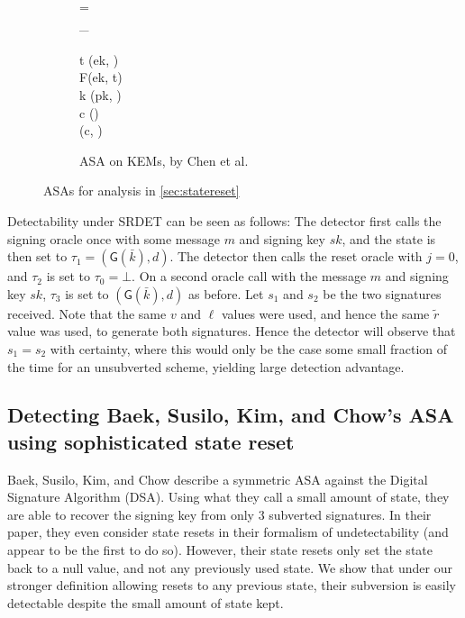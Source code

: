 \begin{figure}
\begin{subfigure}[t]{0.25\textwidth}
{	\pcif \tau = \bot \pcthen \\
	\pcind \tau \sample {}_ \\
	\pcelse \\
	\pcind t \leftarrow {}(ek, \tau) \\
	\pcind \tau \leftarrow \textsf{F}(ek, t) \\
	k \leftarrow {}(pk, \tau) \\
	c \leftarrow {}(\tau) \\
	\pcreturn (c, \tau)
}
\caption{ASA on KEMs, by Chen et al. \cite{AC:CheHuaYun20}}
\label{figure:chysubv}
\end{subfigure}
\caption{ASAs for analysis in \autoref{sec:statereset}}
\end{figure}

Detectability under SRDET can be seen as follows: The detector first calls the signing oracle once with some message $m$ and signing key $sk$, and the state is then set to $\tau_1 = (\textsf{G}(\bar{k}), d)$. The detector then calls the reset oracle with $j=0$, and $\tau_2$ is set to $\tau_0 = \bot$. On a second oracle call with the message $m$ and signing key $sk$, $\tau_3$ is set to $(\textsf{G}(\bar{k}), d)$ as before. Let $s_1$ and $s_2$ be the two signatures received. Note that the same $v$ and $\ell$ values were used, and hence the same $\tilde{r}$ value was used, to generate both signatures. Hence the detector will observe that $s_1=s_2$ with certainty, where this would only be the case some small fraction of the time for an unsubverted scheme, yielding large detection advantage.

\subsection{Detecting Baek, Susilo, Kim, and Chow's ASA using sophisticated state reset} \label{sec:attackasas:bskc}

Baek, Susilo, Kim, and Chow \cite{BSKC2019} describe a symmetric ASA against the Digital Signature Algorithm (DSA). Using what they call a small amount of state, they are able to recover the signing key from only 3 subverted signatures. In their paper, they even consider state resets in their formalism of undetectability (and appear to be the first to do so). However, their state resets only set the state back to a null value, and not any previously used state. We show that under our stronger definition allowing resets to any previous state, their subversion is easily detectable despite the small amount of state kept.


